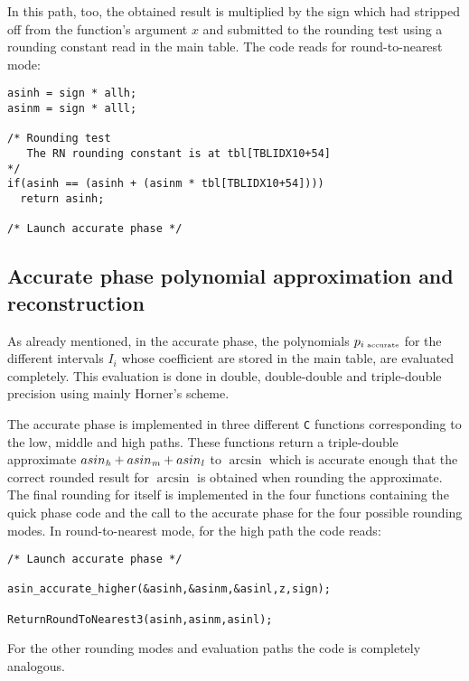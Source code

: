 In this path, too, the obtained result is multiplied by the sign which
had stripped off from the function's argument $x$ and submitted to the
rounding test using a rounding constant read in the main table. The
code reads for round-to-nearest mode:
\begin{lstlisting}[caption={Multiplication of the function's sign, rounding test (round-to-nearest)},firstnumber=1]
asinh = sign * allh;
asinm = sign * alll;

/* Rounding test
   The RN rounding constant is at tbl[TBLIDX10+54]
*/
if(asinh == (asinh + (asinm * tbl[TBLIDX10+54])))
  return asinh;

/* Launch accurate phase */
\end{lstlisting}
\subsection{Accurate phase polynomial approximation and reconstruction}\label{subsec:asinaccupolynomial}
As already mentioned, in the accurate phase, the polynomials
$p_{i\mbox{\tiny ~accurate}}$ for the different intervals $I_i$ whose
coefficient are stored in the main table, are evaluated completely.
This evaluation is done in double, double-double and triple-double
precision using mainly Horner's scheme.

The accurate phase is implemented in three different {\tt C} functions
corresponding to the low, middle and high paths. These functions
return a triple-double approximate $asin_{\mathit{h}} + asin_{\mathit{m}} + asin_{\mathit{l}}$ to
$\arcsin$ which is accurate enough that the correct rounded result for
$\arcsin$ is obtained when rounding the approximate.  The final
rounding for itself is implemented in the four functions containing
the quick phase code and the call to the accurate phase for the four
possible rounding modes. In round-to-nearest mode, for the high path
the code reads:
\begin{lstlisting}[caption={Final rounding of the accurate phase result (RN)},firstnumber=1]
/* Launch accurate phase */

asin_accurate_higher(&asinh,&asinm,&asinl,z,sign);

ReturnRoundToNearest3(asinh,asinm,asinl);
\end{lstlisting}
For the other rounding modes and evaluation paths the code is
completely analogous.

